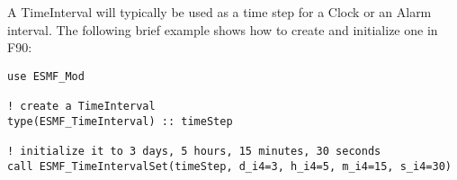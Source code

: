 
A TimeInterval will typically be used as a time step for a Clock
or an Alarm interval.  The following brief example shows how to create 
and initialize one in F90:

\begin{verbatim}
use ESMF_Mod

! create a TimeInterval
type(ESMF_TimeInterval) :: timeStep

! initialize it to 3 days, 5 hours, 15 minutes, 30 seconds
call ESMF_TimeIntervalSet(timeStep, d_i4=3, h_i4=5, m_i4=15, s_i4=30)

\end{verbatim}

